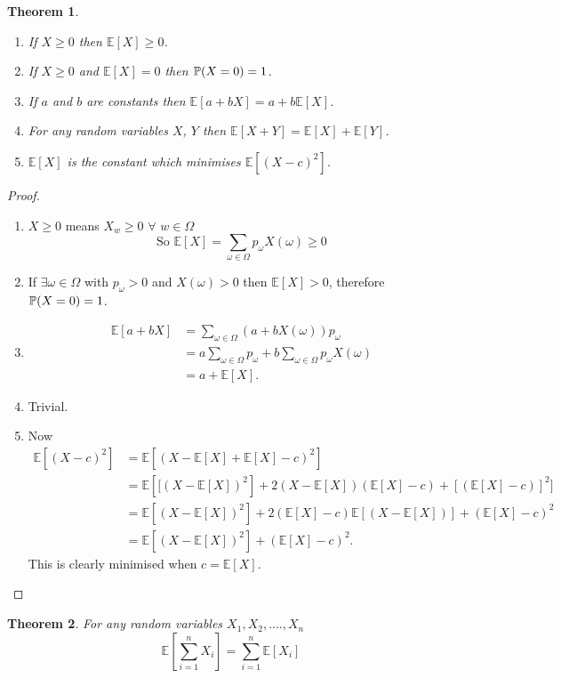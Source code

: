 \documentclass{notes}
\theoremstyle{plain}
\newtheorem{theorem}{Theorem}[chapter]
\newcommand{\bP}{\mathbb{P}}
\newcommand{\bE}{\mathbb{E}}
\newcommand{\prob}[1]{\bP \negthinspace\left(#1\right)}
\newcommand{\expect}[1]{\bE\!\left[#1\right]}
\begin{document}
\begin{theorem}\hfill
\begin{enumerate}
\item If $X \geq 0$ then $\expect{X} \geq 0$.
\item If $X \geq 0$ and $\expect{X} =0$ then $\prob{X=0} = 1$.
\item If $a$ and $b$ are constants then
$\expect{a + b X} = a + b \expect{X}$.
\item For any random variables $X$, $Y$ then
$\expect{X+Y} = \expect{X} + \expect{Y}$.
\item $\expect{X}$ is the constant which
minimises $\expect{\left( X - c \right)^2}$.
\end{enumerate}
\end{theorem}
\begin{proof}

\begin{enumerate}
\item $X \geq 0$ means $X_w \geq 0$ $\forall$ $w\in \Omega$
\[
\text{So }  \expect{X} = \sum_{\omega\in\Omega} p_{\omega}X{(\omega)}\geq 0
\]
\item If $\exists \omega \in \Omega$ with $p_{\omega}>0$ and $X{(\omega)}> 0$
then  $\expect{X} > 0$, therefore   $\prob{X=0} = 1$.
\item
\begin{align*}
\expect{a+bX}  &= \sum_{\omega\in\Omega} \left(a+ b X(\omega)\right)
p_\omega \\
&= a \sum_{\omega\in\Omega} p_\omega + b \sum_{\omega\in\Omega}
p_\omega X(\omega) \\
&= a + \expect{X}.
\end{align*}
\item Trivial.
\item Now
\begin{align*}
\expect{(X-c)^2} &= \expect{(X - \expect{X} + \expect{X} - c)^2}\\
&=\expect{[(X-\expect{X})^2} + 2(X-\expect{X})(\expect{X}-c) + 
[(\expect{X}-c)]^2]\\
&= \expect{(X - \expect{X})^2} + 2(\expect{X}-c)\expect{(X-\expect{X})}
+ (\expect{X} - c)^2\\
&=  \expect{(X - \expect{X})^2} + (\expect{X} - c)^2. 
\end{align*}
This is clearly minimised when $c = \expect{X}$.
\end{enumerate}
\end{proof}

\begin{theorem}
For any random variables $X_1, X_2,...., X_n$
\[
\expect{\sum_{i=1}^n X_i} = \sum_{i=1}^n\expect{X_i}
\]
\end{theorem}
\end{document}
